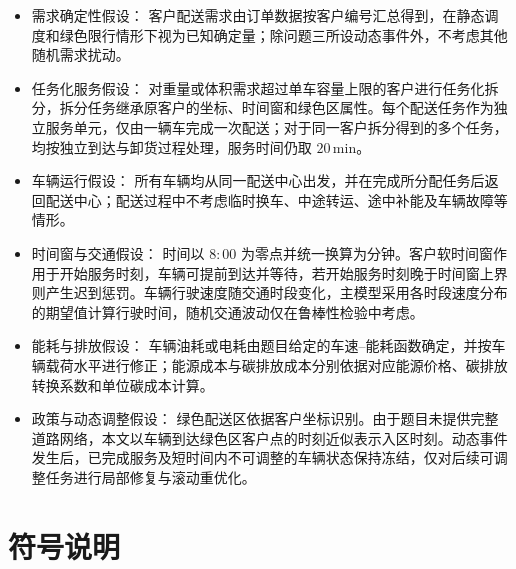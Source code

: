 \documentclass[withoutpreface,bwprint]{cumcmthesis} %
\begin{document}
\enlargethispage{\baselineskip}
\begin{itemize}[leftmargin=2em,itemsep=0.18em,topsep=0pt,parsep=0pt,partopsep=0pt]
    \item {\heiti 需求确定性假设：}
    客户配送需求由订单数据按客户编号汇总得到，在静态调度和绿色限行情形下视为已知确定量；除问题三所设动态事件外，不考虑其他随机需求扰动。

    \item {\heiti 任务化服务假设：}
    对重量或体积需求超过单车容量上限的客户进行任务化拆分，拆分任务继承原客户的坐标、时间窗和绿色区属性。每个配送任务作为独立服务单元，仅由一辆车完成一次配送；对于同一客户拆分得到的多个任务，均按独立到达与卸货过程处理，服务时间仍取 $20\,\mathrm{min}$。

    \item {\heiti 车辆运行假设：}
    所有车辆均从同一配送中心出发，并在完成所分配任务后返回配送中心；配送过程中不考虑临时换车、中途转运、途中补能及车辆故障等情形。

    \item {\heiti 时间窗与交通假设：}
    时间以 $8{:}00$ 为零点并统一换算为分钟。客户软时间窗作用于开始服务时刻，车辆可提前到达并等待，若开始服务时刻晚于时间窗上界则产生迟到惩罚。车辆行驶速度随交通时段变化，主模型采用各时段速度分布的期望值计算行驶时间，随机交通波动仅在鲁棒性检验中考虑。

    \item {\heiti 能耗与排放假设：}
    车辆油耗或电耗由题目给定的车速--能耗函数确定，并按车辆载荷水平进行修正；能源成本与碳排放成本分别依据对应能源价格、碳排放转换系数和单位碳成本计算。

    \item {\heiti 政策与动态调整假设：}
    绿色配送区依据客户坐标识别。由于题目未提供完整道路网络，本文以车辆到达绿色区客户点的时刻近似表示入区时刻。动态事件发生后，已完成服务及短时间内不可调整的车辆状态保持冻结，仅对后续可调整任务进行局部修复与滚动重优化。
\end{itemize}


\section{符号说明}

\begingroup
\renewcommand{\arraystretch}{1.22}
\end{document}
